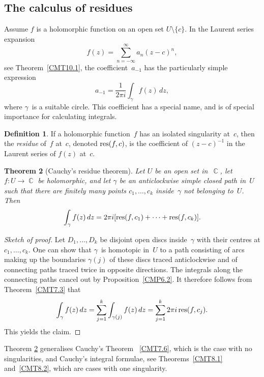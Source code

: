 \documentclass{amsproc}
\newtheorem{theorem}{Theorem}[subsection]
\theoremstyle{definition}
\newtheorem{definition}[theorem]{Definition}
\theoremstyle{remark}
\DeclareMathOperator{\C}{\mathbb{C}}
\DeclareMathOperator{\res}{\textup{res}}
\numberwithin{equation}{section}
\begin{document}
\subsection{The calculus of residues} \label{CMS12}

Assume $ f $ is a holomorphic function on an open set $ U \setminus \{c\} $. In the Laurent series expansion
$$
f(z) = \sum_{n = -\infty}^\infty a_n(z - c)^n,
$$
see Theorem~\ref{CMT10.1}, the coefficient~$ a_{-1} $ has the particularly simple expression
$$
a_{-1} = \dfrac{1}{2\pi i} \int_\gamma f(z)\,dz,
$$
where $ \gamma $~is a suitable circle. This coefficient has a special name, and is of special importance for calculating integrals.

\begin{definition} \label{CMD12.1}
If a holomorphic function~$ f $ has an isolated singularity at~$ c $, then the \emph{residue} of~$ f $ at~$ c $, denoted $ \res(f,c) $, is the coefficient of $ (z - c)^{-1} $
in the Laurent series of $ f(z) $ at~$ c $.
\end{definition}

\begin{theorem}[Cauchy's residue theorem] \label{CMT12.2}
Let $ U $ be an open set in~$ \C $, let $ f: U \to \C $ be holomorphic, and let $ \gamma $ be an anticlockwise simple closed path in~$ U $ such that there are finitely many
points $ c_1, \dots, c_k $ inside~$ \gamma $ not belonging to~$ U $. Then
$$
\int_\gamma f(z)\,dz = 2\pi i[\res(f,c_1) + \cdots + \res(f,c_k)].
$$
\end{theorem}

\begin{proof}[Sketch of proof]
Let $ D_1, \dots, D_k $ be disjoint open discs inside~$ \gamma $ with their centres at $ c_1, \dots, c_k $. One can show that $ \gamma $~is homotopic in~$ U $ to a path consisting
of arcs making up the boundaries $ \gamma(j) $ of these discs traced anticlockwise and of connecting paths traced twice in opposite directions. The integrals along the connecting
paths cancel out by Proposition~\ref{CMP6.2}. It therefore follows from Theorem~\ref{CMT7.3} that
$$
\int_\gamma f(z)\,dz = \sum_{j = 1}^k \int_{\gamma(j)} f(z)\,dz = \sum_{j = 1}^k 2\pi i\res(f,c_j).
$$
This yields the claim.
\end{proof}

Theorem \ref{CMT12.2} generalises Cauchy's Theorem ~\ref{CMT7.6}, which is the case with no singularities, and Cauchy's integral formulae, see Theorems~\ref{CMT8.1} and~\ref{CMT8.2}, which are cases with one singularity.
\end{document}
